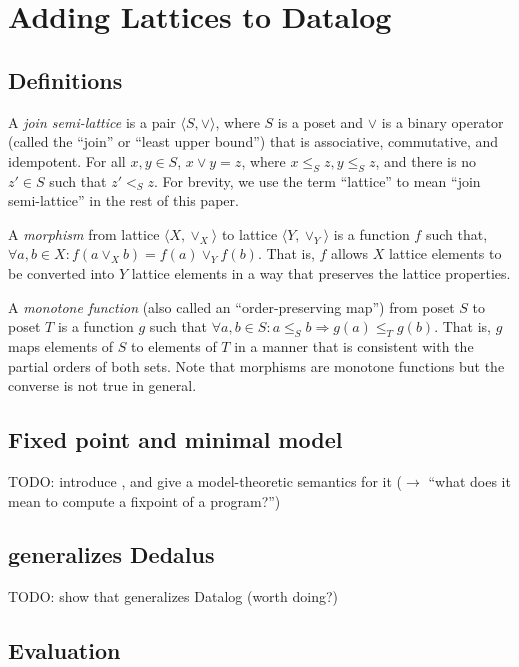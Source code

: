 \section{Adding Lattices to Datalog}
\label{sec:foundation}

\subsection{Definitions}
\label{sec:found-defn}
A \emph{join semi-lattice} is a pair $\langle S, \lor \rangle$, where $S$ is a
poset and $\lor$ is a binary operator (called the ``join'' or ``least upper
bound'') that is associative, commutative, and idempotent. For all $x, y \in S$,
$x \lor y = z$, where $x \leq_S z, y \leq_S z$, and there is no $z' \in S$ such
that $z' <_S z$. For brevity, we use the term ``lattice'' to mean ``join
semi-lattice'' in the rest of this paper.

A \emph{morphism} from lattice $\langle X, \lor_X\rangle$ to lattice $\langle Y,
\lor_Y\rangle$ is a function $f$ such that, $\forall a,b \in X: f(a \lor_X b) =
f(a) \lor_Y f(b)$. That is, $f$ allows $X$ lattice elements to be converted into
$Y$ lattice elements in a way that preserves the lattice properties.

A \emph{monotone function} (also called an ``order-preserving map'') from poset
$S$ to poset $T$ is a function $g$ such that $\forall a,b \in S: a \leq_S b
\Rightarrow g(a) \leq_T g(b)$. That is, $g$ maps elements of $S$ to elements of
$T$ in a manner that is consistent with the partial orders of both sets. Note
that morphisms are monotone functions but the converse is not true in general.

\subsection{Fixed point and minimal model}

TODO: introduce \baselang, and give a model-theoretic semantics for it ($\to$
``what does it mean to compute a fixpoint of a \baselang program?'')

\subsection{\baselang generalizes Dedalus}

TODO: show that \baselang generalizes Datalog (worth doing?)

\subsection{Evaluation}

